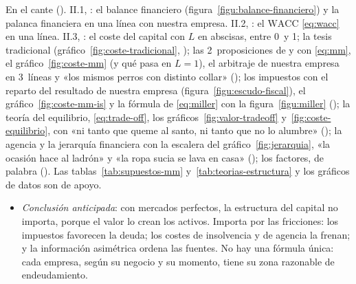 \documentclass[11pt]{article}
\begin{document}
\begin{notaopositor}
En el cante (). II.1, : el balance financiero (figura~\ref{figu:balance-financiero}) y la palanca financiera en una línea con nuestra empresa. II.2, : el $\mathrm{WACC}$ \eqref{eq:wacc} en una línea. II.3, : el coste del capital con $L$ en abscisas, entre 0~y 1; la tesis tradicional (gráfico~\ref{fig:coste-tradicional}, ); las 2~proposiciones de  y  con \eqref{eq:mm}, el gráfico~\ref{fig:coste-mm} (y qué pasa en $L=1$), el arbitraje de nuestra empresa en 3~líneas y «los mismos perros con distinto collar» (); los impuestos con el reparto del resultado de nuestra empresa (figura~\ref{figu:escudo-fiscal}), el gráfico~\ref{fig:coste-mm-is} y la fórmula de  \eqref{eq:miller} con la figura~\ref{figu:miller} (); la teoría del equilibrio, \eqref{eq:trade-off}, los gráficos~\ref{fig:valor-tradeoff} y~\ref{fig:coste-equilibrio}, con «ni tanto que queme al santo, ni tanto que no lo alumbre» (); la agencia y la jerarquía financiera con la escalera del gráfico~\ref{fig:jerarquia}, «la ocasión hace al ladrón» y «la ropa sucia se lava en casa» (); los factores, de palabra (). Las tablas~\ref{tab:supuestos-mm} y~\ref{tab:teorias-estructura} y los gráficos de datos son de apoyo.
\end{notaopositor}

\begin{itemize}
\item \emph{Conclusión anticipada}: con mercados perfectos, la estructura del capital no importa, porque el valor lo crean los activos. Importa por las fricciones: los impuestos favorecen la deuda; los costes de insolvencia y de agencia la frenan; y la información asimétrica ordena las fuentes. No hay una fórmula única: cada empresa, según su negocio y su momento, tiene su zona razonable de endeudamiento.
\end{itemize}
\end{document}
